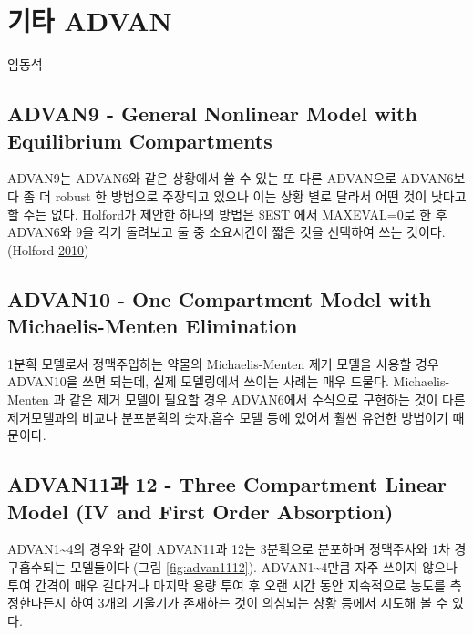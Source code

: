 \documentclass[
  10pt,
  krantz2,
  a4paper]{krantz}
\theoremstyle{definition}
\theoremstyle{definition}
\theoremstyle{definition}
\theoremstyle{remark}
\begin{document}
\hypertarget{newer-advan}{%
\chapter{기타 ADVAN}\label{newer-advan}}

임동석

\hypertarget{advan9---general-nonlinear-model-with-equilibrium-compartments}{%
\section{ADVAN9 - General Nonlinear Model with Equilibrium Compartments}\label{advan9---general-nonlinear-model-with-equilibrium-compartments}}

ADVAN9는 ADVAN6와 같은 상황에서 쓸 수 있는 또 다른 ADVAN으로 ADVAN6보다 좀 더 robust 한 방법으로 주장되고 있으나 이는 상황 별로 달라서 어떤 것이 낫다고 할 수는 없다. Holford가 제안한 하나의 방법은 \$EST 에서 MAXEVAL=0로 한 후 ADVAN6와 9을 각기 돌려보고 둘 중 소요시간이 짧은 것을 선택하여 쓰는 것이다. (Holford \protect\hyperlink{ref-nickholford}{2010})

\hypertarget{advan10---one-compartment-model-with-michaelis-menten-elimination}{%
\section{ADVAN10 - One Compartment Model with Michaelis-Menten Elimination}\label{advan10---one-compartment-model-with-michaelis-menten-elimination}}

1분획 모델로서 정맥주입하는 약물의 Michaelis-Menten 제거 모델을 사용할 경우 ADVAN10을 쓰면 되는데, 실제 모델링에서 쓰이는 사례는 매우 드물다. Michaelis-Menten 과 같은 제거 모델이 필요할 경우 ADVAN6에서 수식으로 구현하는 것이 다른 제거모델과의 비교나 분포분획의 숫자,흡수 모델 등에 있어서 훨씬 유연한 방법이기 때문이다.

\hypertarget{advan11uxacfc-12---three-compartment-linear-model-iv-and-first-order-absorption}{%
\section{ADVAN11과 12 - Three Compartment Linear Model (IV and First Order Absorption)}\label{advan11uxacfc-12---three-compartment-linear-model-iv-and-first-order-absorption}}

ADVAN1\textasciitilde4의 경우와 같이 ADVAN11과 12는 3분획으로 분포하며 정맥주사와 1차 경구흡수되는 모델들이다 (그림 \ref{fig:advan1112}). ADVAN1\textasciitilde4만큼 자주 쓰이지 않으나 투여 간격이 매우 길다거나 마지막 용량 투여 후 오랜 시간 동안 지속적으로 농도를 측정한다든지 하여 3개의 기울기가 존재하는 것이 의심되는 상황 등에서 시도해 볼 수 있다.
\end{document}
